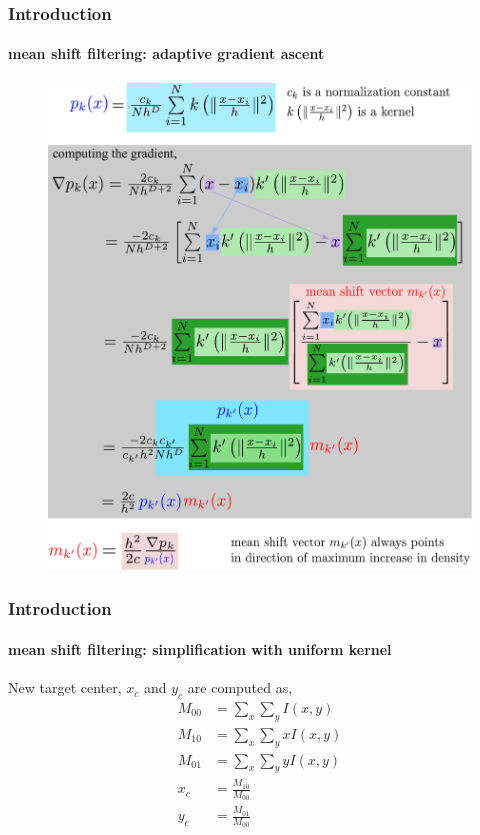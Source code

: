 \begin{frame}
\frametitle{Introduction}
\framesubtitle{mean shift filtering: adaptive gradient ascent}
\logoCSIPCPL\mypagenum
	\begin{figure}				
		\includegraphics[height=.85\textheight]{figs/PRML_meanShift.pdf}
	\end{figure}
\end{frame}





\begin{frame}
\frametitle{Introduction}
\framesubtitle{mean shift filtering: simplification with uniform kernel}
\mypagenum
	New target center, $x_c$ and $y_c$ are computed as,
	\begin{align*}
		\label{eq:MeanShiftEquations}
		M_{00}&=\sum_x\sum_yI(x,y)		\\
		M_{10}&=\sum_x\sum_yxI(x,y)		\\
		M_{01}&=\sum_x\sum_yyI(x,y)		\\
		x_c&=\frac{M_{10}}{M_{00}}		\\
		y_c&=\frac{M_{01}}{M_{00}}
	\end{align*}
\end{frame}





